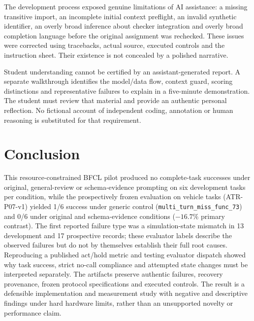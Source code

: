 \documentclass[conference]{IEEEtran}
\newcommand{\code}[1]{\texttt{#1}}
\begin{document}
The development process exposed genuine limitations of AI assistance: a missing transitive import, an incomplete initial context preflight, an invalid synthetic identifier, an overly broad inference about checker integration and overly broad completion language before the original assignment was rechecked. These issues were corrected using tracebacks, actual source, executed controls and the instruction sheet. Their existence is not concealed by a polished narrative.

Student understanding cannot be certified by an assistant-generated report. A separate walkthrough identifies the model/data flow, context guard, scoring distinctions and representative failures to explain in a five-minute demonstration. The student must review that material and provide an authentic personal reflection. No fictional account of independent coding, annotation or human reasoning is substituted for that requirement.

\section{Conclusion}
This resource-constrained BFCL pilot produced no complete-task successes under original, general-review or schema-evidence prompting on six development tasks per condition, while the prospectively frozen evaluation on vehicle tasks (ATR-P07-v1) yielded 1/6 success under generic control (\code{multi_turn_miss_func_73}) and 0/6 under original and schema-evidence conditions ($-16.7\%$ primary contrast). The first reported failure type was a simulation-state mismatch in 13 development and 17 prospective records; these evaluator labels describe the observed failures but do not by themselves establish their full root causes. Reproducing a published act/hold metric and testing evaluator dispatch showed why task success, strict no-call compliance and attempted state changes must be interpreted separately. The artifacts preserve authentic failures, recovery provenance, frozen protocol specifications and executed controls. The result is a defensible implementation and measurement study with negative and descriptive findings under hard hardware limits, rather than an unsupported novelty or performance claim.

\balance


\end{document}
